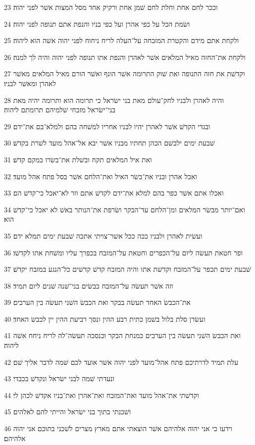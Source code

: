 \par 23 וככר לחם אחת וחלת לחם שׁמן אחת ורקיק אחד מסל המצות אשׁר לפני יהוה׃
\par 24 ושׂמת הכל על כפי אהרן ועל כפי בניו והנפת אתם תנופה לפני יהוה׃
\par 25 ולקחת אתם מידם והקטרת המזבחה על־העלה לריח ניחוח לפני יהוה אשׁה הוא ליהוה׃
\par 26 ולקחת את־החזה מאיל המלאים אשׁר לאהרן והנפת אתו תנופה לפני יהוה והיה לך למנה׃
\par 27 וקדשׁת את חזה התנופה ואת שׁוק התרומה אשׁר הונף ואשׁר הורם מאיל המלאים מאשׁר לאהרן ומאשׁר לבניו׃
\par 28 והיה לאהרן ולבניו לחק־עולם מאת בני ישׂראל כי תרומה הוא ותרומה יהיה מאת בני־ישׂראל מזבחי שׁלמיהם תרומתם ליהוה׃
\par 29 ובגדי הקדשׁ אשׁר לאהרן יהיו לבניו אחריו למשׁחה בהם ולמלא־בם את־ידם׃
\par 30 שׁבעת ימים ילבשׁם הכהן תחתיו מבניו אשׁר יבא אל־אהל מועד לשׁרת בקדשׁ׃
\par 31 ואת איל המלאים תקח ובשׁלת את־בשׂרו במקם קדשׁ׃
\par 32 ואכל אהרן ובניו את־בשׂר האיל ואת־הלחם אשׁר בסל פתח אהל מועד׃
\par 33 ואכלו אתם אשׁר כפר בהם למלא את־ידם לקדשׁ אתם וזר לא־יאכל כי־קדשׁ הם׃
\par 34 ואם־יותר מבשׂר המלאים ומן־הלחם עד־הבקר ושׂרפת את־הנותר באשׁ לא יאכל כי־קדשׁ הוא׃
\par 35 ועשׂית לאהרן ולבניו ככה ככל אשׁר־צויתי אתכה שׁבעת ימים תמלא ידם׃
\par 36 ופר חטאת תעשׂה ליום על־הכפרים וחטאת על־המזבח בכפרך עליו ומשׁחת אתו לקדשׁו׃
\par 37 שׁבעת ימים תכפר על־המזבח וקדשׁת אתו והיה המזבח קדשׁ קדשׁים כל־הנגע במזבח יקדשׁ׃
\par 38 וזה אשׁר תעשׂה על־המזבח כבשׂים בני־שׁנה שׁנים ליום תמיד׃
\par 39 את־הכבשׂ האחד תעשׂה בבקר ואת הכבשׂ השׁני תעשׂה בין הערבים׃
\par 40 ועשׂרן סלת בלול בשׁמן כתית רבע ההין ונסך רביעת ההין יין לכבשׂ האחד׃
\par 41 ואת הכבשׂ השׁני תעשׂה בין הערבים כמנחת הבקר וכנסכה תעשׂה־לה לריח ניחח אשׁה ליהוה׃
\par 42 עלת תמיד לדרתיכם פתח אהל־מועד לפני יהוה אשׁר אועד לכם שׁמה לדבר אליך שׁם׃
\par 43 ונעדתי שׁמה לבני ישׂראל ונקדשׁ בכבדי׃
\par 44 וקדשׁתי את־אהל מועד ואת־המזבח ואת־אהרן ואת־בניו אקדשׁ לכהן לי׃
\par 45 ושׁכנתי בתוך בני ישׂראל והייתי להם לאלהים׃
\par 46 וידעו כי אני יהוה אלהיהם אשׁר הוצאתי אתם מארץ מצרים לשׁכני בתוכם אני יהוה אלהיהם׃

